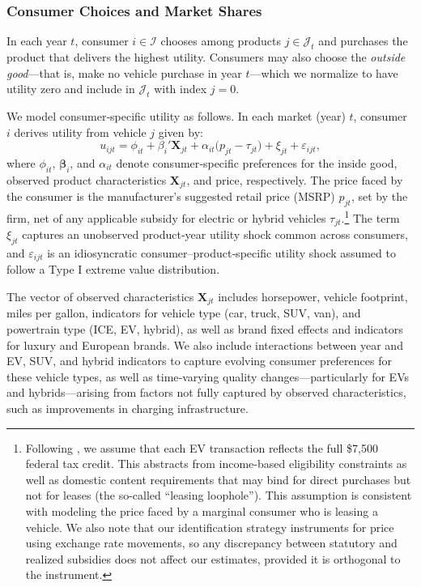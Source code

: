 \documentclass[11pt]{article}
\begin{document}
\subsubsection{Consumer Choices and Market Shares}

In each year \(t\), consumer \(i \in \mathcal{I}\) chooses among products \(j \in \mathcal{J}_t\) and purchases the product that delivers the highest utility. Consumers may also choose the \emph{outside good}—that is, make no vehicle purchase in year \(t\)—which we normalize to have utility zero and include in \(\mathcal{J}_t\) with index \(j=0\).

We model consumer‑specific utility as follows. In each market (year) \(t\), consumer \(i\) derives utility from vehicle \(j\) given by:
\begin{equation}\label{eq:BLP_util}
    u_{ijt} = \phi_{it} + \beta_{i}' \mathbf{X}_{jt} + \alpha_{it}\bigl(p_{jt} - \tau_{jt}\bigr) + \xi_{jt} + \varepsilon_{ijt},
\end{equation}
where \(\phi_{it}\), \(\boldsymbol{\beta}_{i}\), and \(\alpha_{it}\) denote consumer‑specific preferences for the inside good, observed product characteristics \(\mathbf{X}_{jt}\), and price, respectively. The price faced by the consumer is the manufacturer’s suggested retail price (MSRP) \(p_{jt}\), set by the firm, net of any applicable subsidy for electric or hybrid vehicles \(\tau_{jt}\).\footnote{Following \cite{allcott_effects_2024}, we assume that each EV transaction reflects the full \$7,500 federal tax credit. This abstracts from income-based eligibility constraints as well as domestic content requirements that may bind for direct purchases but not for leases (the so-called ``leasing loophole''). This assumption is consistent with modeling the price faced by a marginal consumer who is leasing a vehicle. We also note that our identification strategy instruments for price using exchange rate movements, so any discrepancy between statutory and realized subsidies does not affect our estimates, provided it is orthogonal to the instrument.} The term \(\xi_{jt}\) captures an unobserved product‑year utility shock common across consumers, and \(\varepsilon_{ijt}\) is an idiosyncratic consumer–product‑specific utility shock assumed to follow a Type I extreme value distribution.

The vector of observed characteristics \(\mathbf{X}_{jt}\) includes horsepower, vehicle footprint, miles per gallon, indicators for vehicle type (car, truck, SUV, van), and powertrain type (ICE, EV, hybrid), as well as brand fixed effects and indicators for luxury and European brands. We also include interactions between year and EV, SUV, and hybrid indicators to capture evolving consumer preferences for these vehicle types, as well as time‑varying quality changes—particularly for EVs and hybrids—arising from factors not fully captured by observed characteristics, such as improvements in charging infrastructure.
\end{document}
